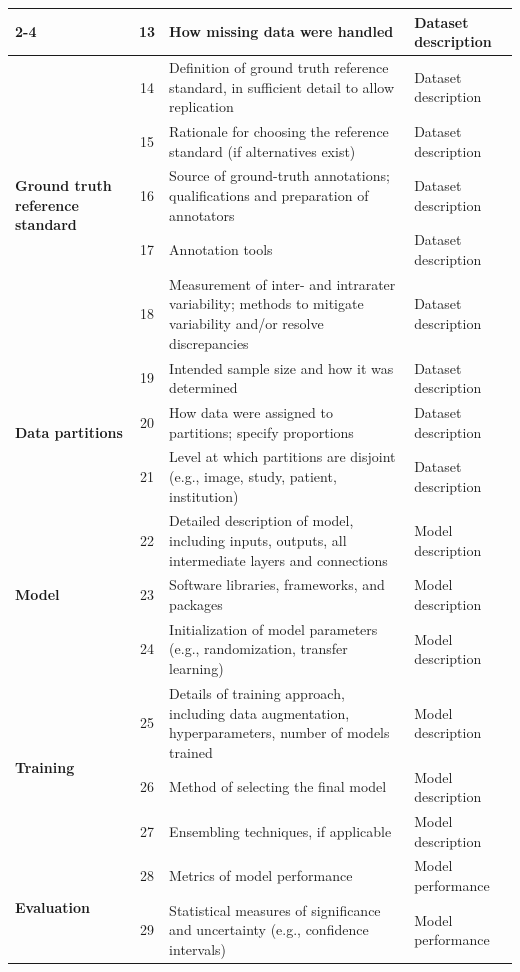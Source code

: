 \begin{longtable}{|p{2cm}|c|p{7.2cm}|p{2.8cm}|}
\cline{2-4}
 & 13 & How missing data were handled & Dataset description \\
\hline
\multirow{5}{=}{\textbf{Ground truth reference standard}}
 & 14 & Definition of ground truth reference standard, in sufficient detail to allow replication & Dataset description \\
\cline{2-4}
 & 15 & Rationale for choosing the reference standard (if alternatives exist) & Dataset description \\
\cline{2-4}
 & 16 & Source of ground-truth annotations; qualifications and preparation of annotators & Dataset description \\
\cline{2-4}
 & 17 & Annotation tools & Dataset description \\
\cline{2-4}
 & 18 & Measurement of inter- and intrarater variability; methods to mitigate variability and/or resolve discrepancies & Dataset description \\
\hline
\multirow{3}{=}{\textbf{Data partitions}}
 & 19 & Intended sample size and how it was determined & Dataset description \\
\cline{2-4}
 & 20 & How data were assigned to partitions; specify proportions & Dataset description \\
\cline{2-4}
 & 21 & Level at which partitions are disjoint (e.g., image, study, patient, institution) & Dataset description \\
\hline
\multirow{3}{=}{\textbf{Model}}
 & 22 & Detailed description of model, including inputs, outputs, all intermediate layers and connections & Model description \\
\cline{2-4}
 & 23 & Software libraries, frameworks, and packages & Model description \\
\cline{2-4}
 & 24 & Initialization of model parameters (e.g., randomization, transfer learning) & Model description \\
\hline
\multirow{3}{=}{\textbf{Training}}
 & 25 & Details of training approach, including data augmentation, hyperparameters, number of models trained & Model description \\
\cline{2-4}
 & 26 & Method of selecting the final model & Model description \\
\cline{2-4}
 & 27 & Ensembling techniques, if applicable & Model description \\
\hline
\multirow{5}{=}{\textbf{Evaluation}}
 & 28 & Metrics of model performance & Model performance \\
\cline{2-4}
 & 29 & Statistical measures of significance and uncertainty (e.g., confidence intervals) & Model performance \\

\end{longtable}
